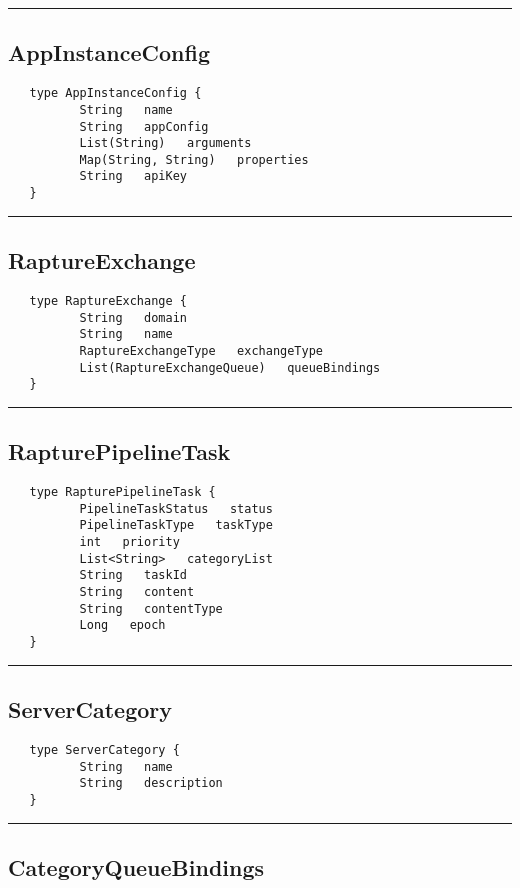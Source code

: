 \rule{15cm}{2pt}
\subsection{AppInstanceConfig}
\label{type:AppInstanceConfig}

\begin{verbatim}
   type AppInstanceConfig {
          String   name
          String   appConfig
          List(String)   arguments
          Map(String, String)   properties
          String   apiKey
   }
\end{verbatim}

\rule{15cm}{2pt}
\subsection{RaptureExchange}
\label{type:RaptureExchange}

\begin{verbatim}
   type RaptureExchange {
          String   domain
          String   name
          RaptureExchangeType   exchangeType
          List(RaptureExchangeQueue)   queueBindings
   }
\end{verbatim}

\rule{15cm}{2pt}
\subsection{RapturePipelineTask}
\label{type:RapturePipelineTask}

\begin{verbatim}
   type RapturePipelineTask {
          PipelineTaskStatus   status
          PipelineTaskType   taskType
          int   priority
          List<String>   categoryList
          String   taskId
          String   content
          String   contentType
          Long   epoch
   }
\end{verbatim}

\rule{15cm}{2pt}
\subsection{ServerCategory}
\label{type:ServerCategory}

\begin{verbatim}
   type ServerCategory {
          String   name
          String   description
   }
\end{verbatim}

\rule{15cm}{2pt}
\subsection{CategoryQueueBindings}
\label{type:CategoryQueueBindings}

